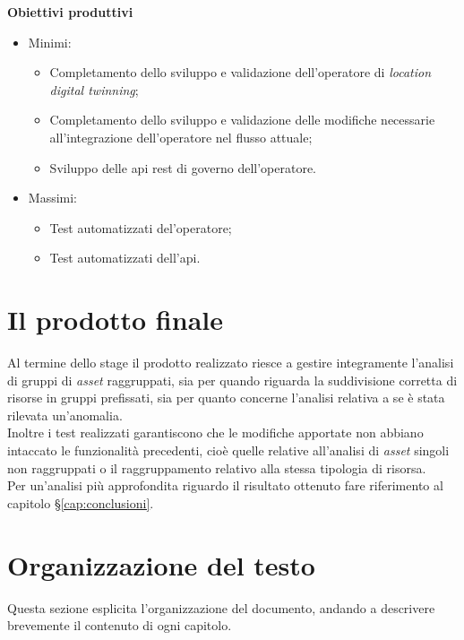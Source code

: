 \noindent \textbf{Obiettivi produttivi}
\begin{itemize}
	\item{Minimi:
		\begin{itemize}
			\item{Completamento dello sviluppo e validazione dell’operatore di \textit{location digital twinning};}
			\item{Completamento dello sviluppo e validazione delle modifiche necessarie all’integrazione dell’operatore nel flusso attuale;}
			\item{Sviluppo delle \gls{api} \gls{rest} di governo dell’operatore.}
		\end{itemize}			
	}
	\item{Massimi:
		\begin{itemize}
			\item{Test automatizzati del’operatore;}
			\item{Test automatizzati dell’\gls{api}.}
		\end{itemize}			
	}
\end{itemize}


\section{Il prodotto finale}
Al termine dello stage il prodotto realizzato riesce a gestire integramente l'analisi di gruppi di \textit{asset} raggruppati, sia per quando riguarda la suddivisione corretta di risorse in gruppi prefissati, sia per quanto concerne l'analisi relativa a se è stata rilevata un'anomalia.\\
Inoltre i test realizzati garantiscono che le modifiche apportate non abbiano intaccato le funzionalità precedenti, cioè quelle relative all'analisi di \textit{asset} singoli non raggruppati o il raggruppamento relativo alla stessa tipologia di risorsa.\\
Per un'analisi più approfondita riguardo il risultato ottenuto fare riferimento al capitolo \S\ref{cap:conclusioni}.




\section{Organizzazione del testo}
Questa sezione esplicita l'organizzazione del documento, andando a descrivere brevemente il contenuto di ogni capitolo.

